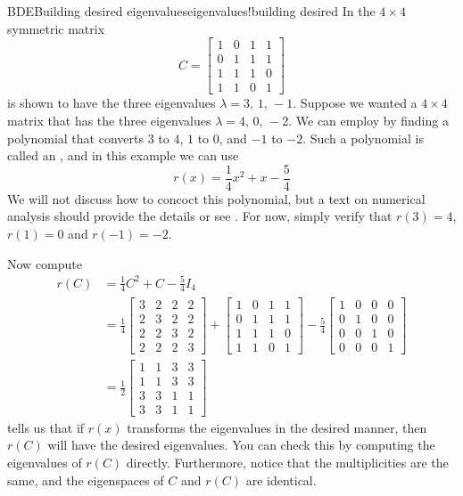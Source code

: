 \begin{example}{BDE}{Building desired eigenvalues}{eigenvalues!building desired}
In  the $4\times 4$ symmetric matrix
%
\begin{equation*}
C=
\begin{bmatrix}
1 &  0 &  1 &  1\\
0 &  1 &  1 &  1\\
1 &  1 &  1 &  0\\
1 &  1 &  0 &  1
\end{bmatrix}
\end{equation*}
%
is shown to have the three eigenvalues $\lambda=3,\,1,\,-1$.  Suppose we wanted a $4\times 4$ matrix that has the three eigenvalues $\lambda=4,\,0,\,-2$.  We can employ  by finding a polynomial that converts $3$ to $4$, $1$ to $0$, and $-1$ to $-2$.  Such a polynomial is called an , and in this example we can use
%
\begin{equation*}
r(x)=\frac{1}{4}x^2+x-\frac{5}{4}
\end{equation*}
%
We will not discuss how to concoct this polynomial, but a text on numerical analysis should provide the details or see .  For now, simply verify that $r(3)=4$, $r(1)=0$ and $r(-1)=-2$.\par
%
Now compute
%
\begin{align*}
r(C)&=\frac{1}{4}C^2+C-\frac{5}{4}I_4\\
&=
\frac{1}{4}
\begin{bmatrix}
3 &  2 &  2 &  2\\
2 &  3 &  2 &  2\\
2 &  2 &  3 &  2\\
2 &  2 &  2 &  3
\end{bmatrix}
+
\begin{bmatrix}
1 &  0 &  1 &  1\\
0 &  1 &  1 &  1\\
1 &  1 &  1 &  0\\
1 &  1 &  0 &  1
\end{bmatrix}
-\frac{5}{4}
\begin{bmatrix}
1 &  0 &  0 &  0\\
0 &  1 &  0 &  0\\
0 &  0 &  1 &  0\\
0 &  0 &  0 &  1
\end{bmatrix}\\
%
&=
\frac{1}{2}
\begin{bmatrix}
1 &  1 &  3 &  3\\
1 &  1 &  3 &  3\\
3 &  3 &  1 &  1\\
3 &  3 &  1 &  1
\end{bmatrix}
%
\end{align*}
%
 tells us that if $r(x)$ transforms the eigenvalues in the desired manner, then $r(C)$ will have the desired eigenvalues.  You can check this by computing the eigenvalues of $r(C)$ directly.  Furthermore, notice that the multiplicities are the same, and the eigenspaces of $C$ and $r(C)$ are identical.
\end{example}
